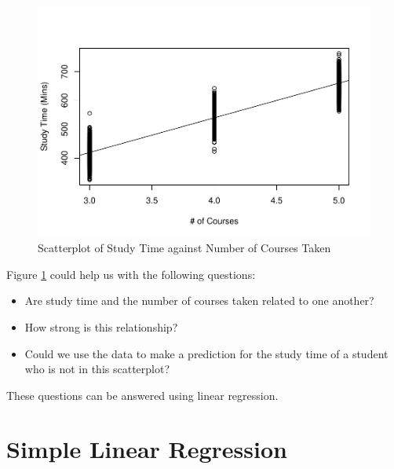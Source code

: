 \documentclass[
]{book}
\newenvironment{Shaded}{\begin{snugshade}}{\end{snugshade}}
\newcommand{\AttributeTok}[1]{\textcolor[rgb]{0.13,0.29,0.53}{#1}}
\newcommand{\DocumentationTok}[1]{\textcolor[rgb]{0.56,0.35,0.01}{\textbf{\textit{#1}}}}
\newcommand{\FunctionTok}[1]{\textcolor[rgb]{0.13,0.29,0.53}{\textbf{#1}}}
\newcommand{\NormalTok}[1]{#1}
\newcommand{\SpecialCharTok}[1]{\textcolor[rgb]{0.81,0.36,0.00}{\textbf{#1}}}
\newcommand{\StringTok}[1]{\textcolor[rgb]{0.31,0.60,0.02}{#1}}
\providecommand{\tightlist}{%
  \setlength{\itemsep}{0pt}\setlength{\parskip}{0pt}}
\begin{document}
\begin{Shaded}
\end{Shaded}

\begin{figure}
\centering
\includegraphics{bookdown-demo_files/figure-latex/10-scatter-1.pdf}
\caption{\label{fig:10-scatter}Scatterplot of Study Time against Number of Courses Taken}
\end{figure}

Figure \ref{fig:10-scatter} could help us with the following questions:

\begin{itemize}
\tightlist
\item
  Are study time and the number of courses taken related to one another?
\item
  How strong is this relationship?
\item
  Could we use the data to make a prediction for the study time of a student who is not in this scatterplot?
\end{itemize}

These questions can be answered using linear regression.

\section{Simple Linear Regression}\label{simple-linear-regression}
\end{document}
